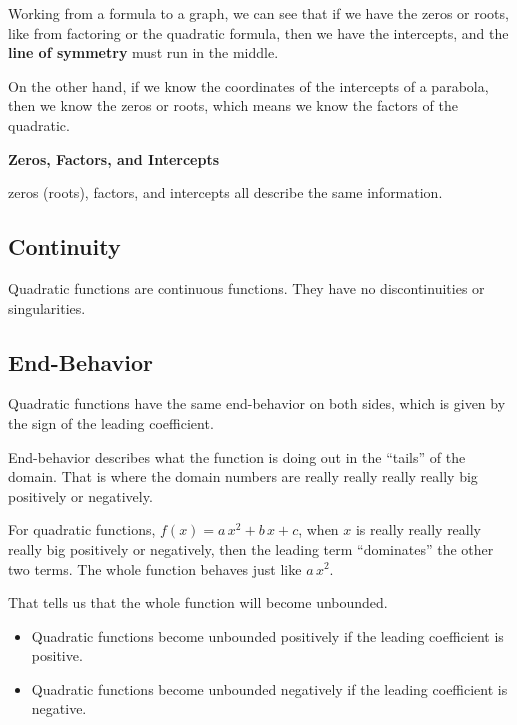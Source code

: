 \documentclass{ximera}
\begin{document}
Working from a formula to a graph, we can see that if we have the zeros or roots, like from factoring or the quadratic formula, then we have the intercepts, and the \textbf{line of symmetry} must run in the middle. 


On the other hand, if we know the coordinates of the intercepts of a parabola, then we know the zeros or roots, which means we know the factors of the quadratic.




\begin{idea} \textbf{\textcolor{blue!55!black}{Zeros, Factors, and Intercepts}} 

zeros (roots), factors, and intercepts all describe the same information.


\end{idea}






\subsection*{Continuity}

Quadratic functions are continuous functions.  They have no discontinuities or singularities. 












\subsection*{End-Behavior}

Quadratic functions have the same end-behavior on both sides, which is given by the sign of the leading coefficient. 


End-behavior describes what the function is doing out in the ``tails'' of the domain.  That is where the domain numbers are really really really really big positively or negatively. 

For quadratic functions, $f(x) = a \, x^2 + b \, x + c$, when $x$ is really really really really big positively or negatively, then the leading term ``dominates'' the other two terms.  The whole function behaves just like $a \, x^2$. 

That tells us that the whole function will become unbounded. 


\begin{itemize}
     \item Quadratic functions become unbounded positively if the leading coefficient is positive.
     \item Quadratic functions become unbounded negatively if the leading coefficient is negative.
\end{itemize}
\end{document}
